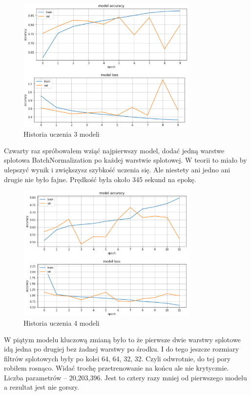 \documentclass{article}
\begin{document}
\begin{figure}[H]
	\centering
	\includegraphics[width=0.8\textwidth,keepaspectratio=true]{history_3}
	\caption{Historia uczenia 3 modeli}
	\label{history_3}
\end{figure}

Czwarty raz spróbowałem wziąć najpierwszy model, dodać jedną warstwe splotowa  BatchNormalization po każdej warstwie splotowej. W teorii to miało by ulepszyć wynik i zwiększysz szybkość uczenia się. Ale niestety ani jedno ani drugie nie było fajne. Prędkość była około 345 sekund na epokę.

\begin{figure}[H]
	\centering
	\includegraphics[width=0.8\textwidth,keepaspectratio=true]{history_4}
	\caption{Historia uczenia 4 modeli}
	\label{history_4}
\end{figure}

W piątym modelu kluczową zmianą było to że pierwsze dwie warstwy splotowe idą jedna po drugiej bez żadnej warstwy po środku. I do tego jeszcze rozmiary filtrów splotowych były po kolei 64, 64, 32, 32. Czyli odwrotnie, do tej pory robiłem rosnąco. Widać trochę przetrenowanie na końcu ale nie krytycznie. Liczba parametrów -- 20,203,396. Jest to cztery razy mniej od pierwszego modelu a rezultat jest nie gorszy.
\end{document}
